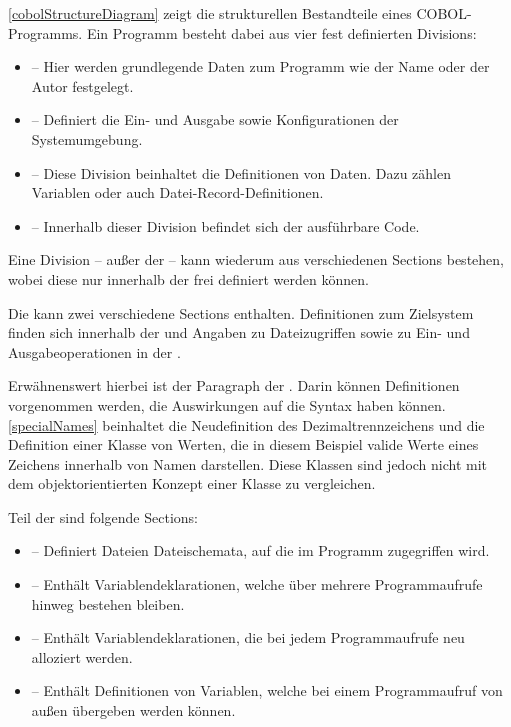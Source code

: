 \autoref{cobolStructureDiagram} zeigt die strukturellen Bestandteile eines COBOL-Programms. 
Ein Programm besteht dabei aus vier fest definierten Divisions:

\begin{itemize}
    \item {} -- Hier werden grundlegende Daten zum Programm wie der Name oder der Autor festgelegt.
    \item {} -- Definiert die Ein- und Ausgabe sowie Konfigurationen der Systemumgebung.
    \item {} -- Diese Division beinhaltet die Definitionen von Daten. Dazu zählen Variablen oder auch Datei-Record-Definitionen.
    \item {} -- Innerhalb dieser Division befindet sich der ausführbare Code.
\end{itemize}

Eine Division -- außer der  -- kann wiederum aus verschiedenen Sections bestehen, wobei diese nur innerhalb der  frei definiert werden können.

Die  kann zwei verschiedene Sections enthalten. Definitionen zum Zielsystem finden sich innerhalb der  und Angaben zu Dateizugriffen sowie zu Ein- und Ausgabeoperationen in der . 


Erwähnenswert hierbei ist der  Paragraph der . Darin können Definitionen vorgenommen werden, die \ua Auswirkungen auf die Syntax haben können. \autoref{specialNames} beinhaltet die Neudefinition des Dezimaltrennzeichens und die Definition einer Klasse von Werten, die in diesem Beispiel valide Werte eines Zeichens innerhalb von Namen darstellen. Diese Klassen sind jedoch nicht mit dem objektorientierten Konzept einer Klasse zu vergleichen. 

Teil der  sind folgende Sections:
\begin{itemize}
    \item {} -- Definiert Dateien \bzw Dateischemata, auf die im Programm zugegriffen wird.
    \item {} -- Enthält Variablendeklarationen, welche über mehrere Programmaufrufe hinweg bestehen bleiben.
    \item {} -- Enthält Variablendeklarationen, die bei jedem Programmaufrufe neu alloziert werden.
    \item {} -- Enthält Definitionen von Variablen, welche bei einem Programmaufruf von außen übergeben werden können.
\end{itemize}

